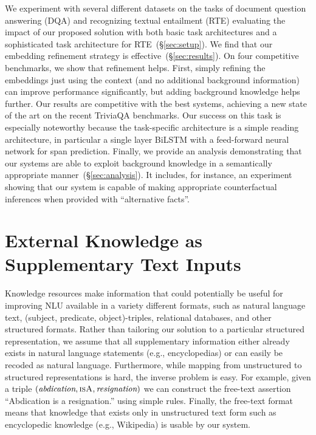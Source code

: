 \documentclass[11pt,a4paper]{article}
\begin{document}
We experiment with several different datasets on the tasks of document question answering (DQA) and recognizing textual entailment (RTE) evaluating the impact of our proposed solution with both basic task architectures and a sophisticated task architecture for RTE~(\S\ref{sec:setup}). We find that our embedding refinement strategy is effective~(\S\ref{sec:results}). On four competitive benchmarks, we show that refinement helps. First, simply refining the embeddings just using the context (and no additional background information) can improve performance significantly, but adding background knowledge helps further. Our results are competitive with the best systems, achieving a new state of the art on the recent TriviaQA benchmarks. Our success on this task is especially noteworthy because the task-specific architecture is a simple reading architecture, in particular a single layer BiLSTM with a feed-forward neural network for span prediction. Finally, we provide an analysis demonstrating that our systems are able to exploit background knowledge in a semantically appropriate manner~(\S\ref{sec:analysis}). It includes, for instance, an experiment showing that our system is capable of making appropriate counterfactual inferences when provided with ``alternative facts''.

\section{External Knowledge as Supplementary Text Inputs}\label{sec:external_knowledge}

Knowledge resources make information that could potentially be useful for improving NLU available in a variety different formats, such as natural language text, (subject, predicate, object)-triples, relational databases, and other structured formats. Rather than tailoring our solution to a particular structured representation, we assume that all supplementary information either already exists in natural language statements (e.g., encyclopedias) or can easily be recoded as natural language. Furthermore, while mapping from unstructured to structured representations is hard, the inverse problem is easy. For example, given a triple $(\textit{abdication}, \textsc{isA}, \textit{resignation})$ we can construct the free-text assertion ``Abdication is a resignation.'' using simple rules. Finally, the free-text format means that knowledge that exists only in unstructured text form such as encyclopedic knowledge (e.g., Wikipedia) is usable by our system.
\end{document}
